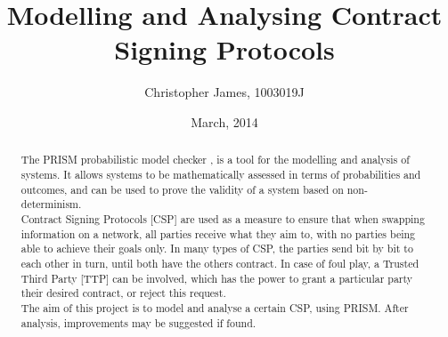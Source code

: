 \documentclass{l4proj}
\begin{document}
\title{Modelling and Analysing Contract Signing Protocols}
\author{Christopher James, 1003019J}
\date{March, 2014}
\maketitle

\begin{abstract}
The PRISM probabilistic model checker \cite{Pri}, is a tool for the modelling and analysis of systems. It allows systems to be mathematically assessed in terms of probabilities and outcomes, and can be used to prove the validity of a system based on non-determinism. \\
Contract Signing Protocols [CSP] are used as a measure to ensure that when swapping information on a network, all parties receive what they aim to, with no parties being able to achieve their goals only. In many types of CSP, the parties send bit by bit to each other in turn, until both have the others contract. In case of foul play, a Trusted Third Party [TTP] can be involved, which has the power to grant a particular party their desired contract, or reject this request. \\
The aim of this project is to model and analyse a certain CSP, using PRISM. After analysis, improvements may be suggested if found.
\end{abstract}

\educationalconsent
%
%
\tableofcontents
\end{document}
